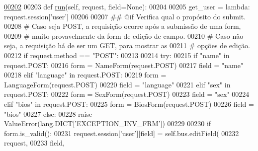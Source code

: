 \begin{DoxyCode}
\hypertarget{classProfile_1_1ProfileUnit_1_1UiFullProfile_l00202}{}\hyperlink{classProfile_1_1ProfileUnit_1_1UiFullProfile_a7a7747246b627020a345f7a3eac27778}{00202} 
00203     \textcolor{keyword}{def }\hyperlink{classProfile_1_1ProfileUnit_1_1UiFullProfile_a7a7747246b627020a345f7a3eac27778}{run}(self, request, field=None):
00204 
00205         get\_user = \textcolor{keyword}{lambda}: request.session[\textcolor{stringliteral}{'user'}]
00206 
00207         \textcolor{comment}{## @if Verifica qual o propósito do submit.}
00208         \textcolor{comment}{#   Caso seja POST, a requisição ocorre após a submissão de uma form,}
00209         \textcolor{comment}{#       muito provavelmente da form de edição de campo.}
00210         \textcolor{comment}{#   Caso não seja, a requisição há de ser um GET, para mostrar as}
00211         \textcolor{comment}{#       opções de edição.}
00212         \textcolor{keywordflow}{if} request.method == \textcolor{stringliteral}{"POST"}:
00213 
00214             \textcolor{keywordflow}{try}:
00215                 \textcolor{keywordflow}{if}   \textcolor{stringliteral}{"name"} \textcolor{keywordflow}{in} request.POST:
00216                     form = NameForm(request.POST)
00217                     field = \textcolor{stringliteral}{"name"}
00218                 \textcolor{keywordflow}{elif} \textcolor{stringliteral}{"language"} \textcolor{keywordflow}{in} request.POST:
00219                     form = LanguageForm(request.POST)
00220                     field = \textcolor{stringliteral}{"language"}
00221                 \textcolor{keywordflow}{elif} \textcolor{stringliteral}{"sex"} \textcolor{keywordflow}{in} request.POST:
00222                     form = SexForm(request.POST)
00223                     field = \textcolor{stringliteral}{"sex"}
00224                 \textcolor{keywordflow}{elif} \textcolor{stringliteral}{"bios"} \textcolor{keywordflow}{in} request.POST:
00225                     form = BiosForm(request.POST)
00226                     field = \textcolor{stringliteral}{"bios"}
00227                 \textcolor{keywordflow}{else}:
00228                     \textcolor{keywordflow}{raise} ValueError(lang.DICT[\textcolor{stringliteral}{'EXCEPTION\_INV\_FRM'}])
00229 
00230                 \textcolor{keywordflow}{if} form.is\_valid():
00231                     request.session[\textcolor{stringliteral}{'user'}][field] = self.bus.editField(
00232                                                         request, 
00233                                                         field, 

\end{DoxyCode}
